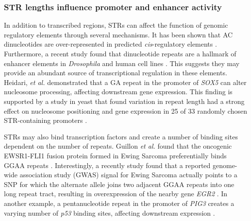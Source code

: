 \subsubsection{STR lengths influence promoter and enhancer activity}
In addition to transcribed regions, STRs can affect the function of genomic regulatory elements through several mechanisms. It has been shown that AC dinucleotides are over-represented in predicted \emph{cis}-regulatory elements \cite{RockmanWray2002}. Furthermore, a recent study found that dinucleotide repeats are a hallmark of enhancer elements in \emph{Drosophila} and human cell lines \cite{Yanez-CunaArnoldStampfelEtAl2014}. This suggests they may provide an abundant source of transcriptional regulation in these elements. Heidari, \emph{et al.} \cite{HeidariNarimanSalehFamEsmaeilzadeh-GharehdaghiEtAl2012} demonstrated that a GA repeat in the promoter of \emph{SOX5} can alter nucleosome processing, affecting downstream gene expression. This finding is supported by a study in yeast that found variation in repeat length had a strong effect on nucleosome positioning and gene expression in 25 of 33 randomly chosen STR-containing promoters \cite{VincesLegendreCaldaraEtAl2009}. 

STRs may also bind transcription factors and create a number of binding sites dependent on the number of repeats. Guillon \emph{et al.} found that the oncogenic EWSR1-FLI1 fusion protein formed in Ewing Sarcoma preferentially binds GGAA repeats \cite{GuillonTirodeBoevaEtAl2009}. Interestingly, a recently study found that a reported genome-wide association study (GWAS) signal for Ewing Sarcoma actually points to a SNP for which the alternate allele joins two adjacent GGAA repeats into one long repeat tract, resulting in overexpression of the nearby gene \emph{EGR2} \cite{GrunewaldBernardGilardi-HebenstreitEtAl2015}. In another example, a pentanucleotide repeat in the promoter of \emph{PIG3} creates a varying number of \emph{p53} binding sites, affecting downstream expression \cite{ContenteDittmerKochEtAl2002}.


